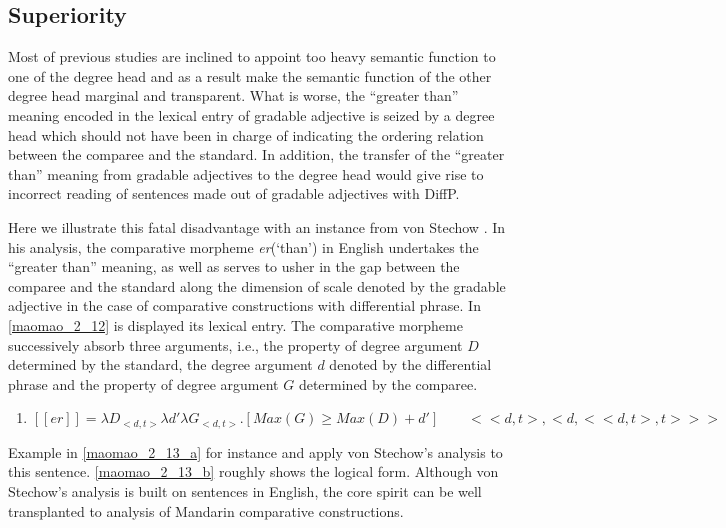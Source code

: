 \documentclass{ctexart}
\let \cite \parencite
\begin{document}
\subsection{Superiority}

\noindent
Most of previous studies are inclined to appoint too heavy semantic function to one of the degree head and as a result make the semantic function of the other degree head marginal and transparent. What is worse, the ``greater than'' meaning encoded in the lexical entry of gradable adjective is seized by a degree head which should not have been in charge of indicating the ordering relation between the comparee and the standard. In addition, the transfer of the ``greater than'' meaning from gradable adjectives to the degree head would give rise to incorrect reading of sentences made out of gradable adjectives with DiffP.

Here we illustrate this fatal disadvantage with an instance from von Stechow \cite{von1984a}. In his analysis, the comparative morpheme \textit{er}(`than') in English undertakes the ``greater than'' meaning, as well as serves to usher in the gap between the comparee and the standard along the dimension of scale denoted by the gradable adjective in the case of comparative constructions with differential phrase. In \ref{maomao_2_12} is displayed its lexical entry. The comparative morpheme successively absorb three arguments, i.e., the property of degree argument $D$ determined by the standard, the degree argument $d$ denoted by the differential phrase and  the property of degree argument $G$ determined by the comparee.

\begin{enumerate}
    \item \label{maomao_2_12}
    $[\![er]\!] = \lambda D_{<d,t>} \lambda d' \lambda G_{<d,t>} . [Max(G) \geq Max(D) + d'] \qquad <<d,t>,<d,<<d,t>,t>>>$
\end{enumerate}

Example in \ref{maomao_2_13_a} for instance and apply von Stechow's analysis to this sentence. \ref{maomao_2_13_b} roughly shows the logical form. Although von Stechow's analysis is built on sentences in English, the core spirit can be well transplanted to analysis of Mandarin comparative constructions.
\end{document}
